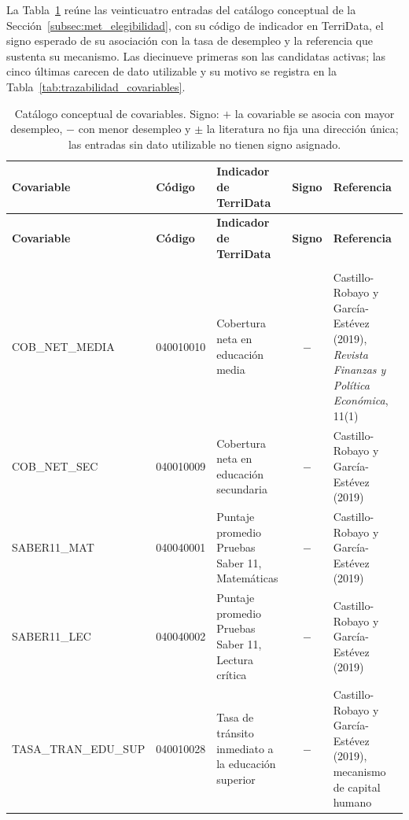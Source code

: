     La Tabla~\ref{tab:catalogo_literatura} reúne las veinticuatro entradas del catálogo conceptual de la Sección~\ref{subsec:met_elegibilidad}, con su código de indicador en TerriData, el signo esperado de su asociación con la tasa de desempleo y la referencia que sustenta su mecanismo. Las diecinueve primeras son las candidatas activas; las cinco últimas carecen de dato utilizable y su motivo se registra en la Tabla~\ref{tab:trazabilidad_covariables}.

    {\footnotesize
    \renewcommand{\arraystretch}{1.2}
    \setlength{\tabcolsep}{4pt}
    \begin{longtable}{>{\raggedright\arraybackslash}p{3.7cm} l
                      >{\raggedright\arraybackslash}p{3.9cm} c
                      >{\raggedright\arraybackslash}p{4.3cm}}
    \caption{Catálogo conceptual de covariables. Signo: $+$ la covariable se asocia con mayor
             desempleo, $-$ con menor desempleo y $\pm$ la literatura no fija una dirección
             única; las entradas sin dato utilizable no tienen signo asignado.}
    \label{tab:catalogo_literatura} \\
    \toprule
    \textbf{Covariable} & \textbf{Código} & \textbf{Indicador de TerriData} & \textbf{Signo} &
    \textbf{Referencia} \\
    \midrule
    \endfirsthead
    \toprule
    \textbf{Covariable} & \textbf{Código} & \textbf{Indicador de TerriData} & \textbf{Signo} &
    \textbf{Referencia} \\
    \midrule
    \endhead
    \bottomrule
    \endfoot
    \multicolumn{5}{l}{\textit{Educación}} \\
    COB\_NET\_MEDIA & 040010010 & Cobertura neta en educación media & $-$ &
        Castillo-Robayo y García-Estévez (2019), \textit{Revista Finanzas y Política Económica}, 11(1) \\
    COB\_NET\_SEC & 040010009 & Cobertura neta en educación secundaria & $-$ &
        Castillo-Robayo y García-Estévez (2019) \\
    SABER11\_MAT & 040040001 & Puntaje promedio Pruebas Saber 11, Matemáticas & $-$ &
        Castillo-Robayo y García-Estévez (2019) \\
    SABER11\_LEC & 040040002 & Puntaje promedio Pruebas Saber 11, Lectura crítica & $-$ &
        Castillo-Robayo y García-Estévez (2019) \\
    TASA\_TRAN\_EDU\_SUP & 040010028 & Tasa de tránsito inmediato a la educación superior & $-$ &
        Castillo-Robayo y García-Estévez (2019), mecanismo de capital humano \\

\end{longtable}}
